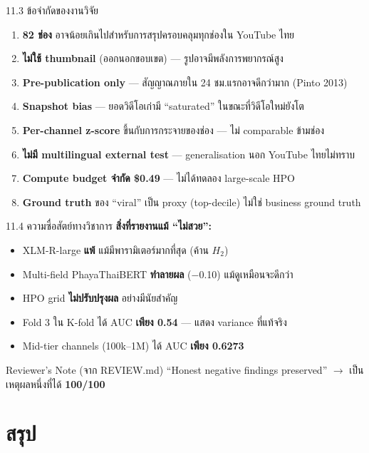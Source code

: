 \documentclass[aspectratio=169,11pt,xcolor=dvipsnames]{beamer}
\newcommand{\hl}[1]{\textcolor{kmitlOrange}{\textbf{#1}}}
\newcommand{\hlb}[1]{\textcolor{kmitlBlue}{\textbf{#1}}}
\begin{document}
\begin{frame}{11.3 ข้อจำกัดของงานวิจัย}
  \begin{enumerate}\setlength\itemsep{0.4em}
    \item \hlb{82 ช่อง} อาจน้อยเกินไปสำหรับการสรุปครอบคลุมทุกช่องใน YouTube ไทย
    \item \hlb{ไม่ใช้ thumbnail} (ออกนอกขอบเขต) — รูปอาจมีพลังการพยากรณ์สูง
    \item \hlb{Pre-publication only} — สัญญาณภายใน 24 ชม.แรกอาจดีกว่ามาก (Pinto 2013)
    \item \hlb{Snapshot bias} — ยอดวิดีโอเก่ามี ``saturated'' ในขณะที่วิดีโอใหม่ยังโต
    \item \hlb{Per-channel z-score} ขึ้นกับการกระจายของช่อง — ไม่ comparable ข้ามช่อง
    \item \hlb{ไม่มี multilingual external test} — generalisation นอก YouTube ไทยไม่ทราบ
    \item \hlb{Compute budget จำกัด \$0.49} — ไม่ได้ทดลอง large-scale HPO
    \item \hlb{Ground truth} ของ ``viral'' เป็น proxy (top-decile) ไม่ใช่ business ground truth
  \end{enumerate}
\end{frame}

\begin{frame}{11.4 ความซื่อสัตย์ทางวิชาการ}
  \textbf{สิ่งที่รายงานแม้ ``ไม่สวย'':}
  \begin{itemize}
    \item XLM-R-large \hl{แพ้} แม้มีพารามิเตอร์มากที่สุด (ค้าน $H_2$)
    \item Multi-field PhayaThaiBERT \hl{ทำลายผล} ($-$0.10) แม้ดูเหมือนจะดีกว่า
    \item HPO grid \hl{ไม่ปรับปรุงผล} อย่างมีนัยสำคัญ
    \item Fold 3 ใน K-fold ได้ AUC \hl{เพียง 0.54} — แสดง variance ที่แท้จริง
    \item Mid-tier channels (100k--1M) ได้ AUC \hl{เพียง 0.6273}
  \end{itemize}
  \vspace{0.4em}
  \begin{block}{Reviewer's Note (จาก REVIEW.md)}
    ``Honest negative findings preserved'' $\rightarrow$ เป็นเหตุผลหนึ่งที่ได้ \hl{100/100}
  \end{block}
\end{frame}

\section{สรุป}
\end{document}
